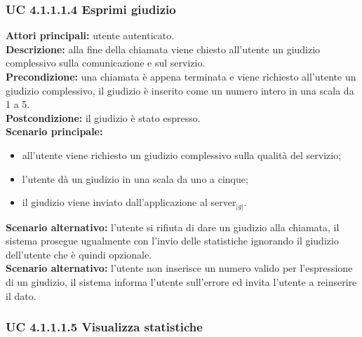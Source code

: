 \subsubsection{UC 4.1.1.1.4 Esprimi giudizio}

\noindent 
\textbf{Attori principali:} utente autenticato.\\
\textbf{Descrizione:} alla fine della chiamata viene chiesto all'utente un giudizio complessivo sulla comunicazione e sul servizio.\\
\textbf{Precondizione:} una chiamata è appena terminata e viene richiesto all'utente un giudizio complessivo, il giudizio è inserito come un numero intero in una scala da 1 a 5.\\
\textbf{Postcondizione:} il giudizio è stato espresso.\\
\textbf{Scenario principale:}
\begin{itemize}
\item all'utente viene richiesto un giudizio complessivo sulla qualità del servizio;
\item l'utente dà un giudizio in una scala da uno a cinque;
\item il giudizio viene inviato dall'applicazione al server$_{|g|}$.
\end{itemize}
\textbf{Scenario alternativo:} l'utente si rifiuta di dare un giudizio alla chiamata, il sistema prosegue ugualmente con l'invio delle statistiche ignorando il giudizio dell'utente che è quindi opzionale.\\
\textbf{Scenario alternativo: } l'utente non inserisce un numero valido per l'espressione di un giudizio, il sistema informa l'utente sull'errore ed invita l'utente a reinserire il dato.

\subsubsection{UC 4.1.1.1.5 Visualizza statistiche}

